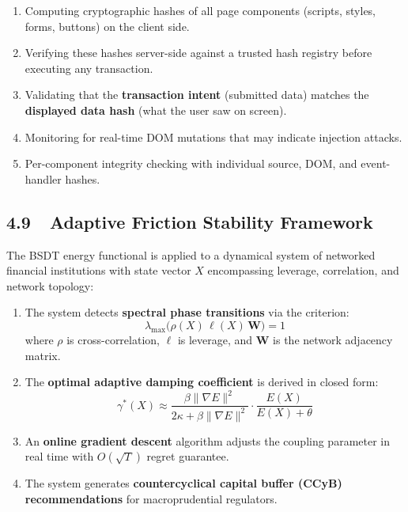 \documentclass[12pt,a4paper]{article}
\begin{document}
\begin{enumerate}
\item Computing cryptographic hashes of all page components (scripts, styles,
  forms, buttons) on the client side.

\item Verifying these hashes server-side against a trusted hash registry
  before executing any transaction.

\item Validating that the \textbf{transaction intent} (submitted data)
  matches the \textbf{displayed data hash} (what the user saw on screen).

\item Monitoring for real-time DOM mutations that may indicate injection
  attacks.

\item Per-component integrity checking with individual source, DOM, and
  event-handler hashes.
\end{enumerate}

\subsection{4.9~~Adaptive Friction Stability Framework}

The BSDT energy functional is applied to a dynamical system of networked
financial institutions with state vector $X$ encompassing leverage, correlation,
and network topology:

\begin{enumerate}
\item The system detects \textbf{spectral phase transitions} via the criterion:
  \[
    \lambda_{\max}\!\bigl(\rho(X) \, \ell(X) \, \mathbf{W}\bigr) = 1
  \]
  where $\rho$ is cross-correlation, $\ell$ is leverage, and $\mathbf{W}$ is
  the network adjacency matrix.

\item The \textbf{optimal adaptive damping coefficient} is derived in closed
  form:
  \[
    \gamma^*(X) \approx
    \frac{\beta \|\nabla E\|^2}{2\kappa + \beta \|\nabla E\|^2} \cdot
    \frac{E(X)}{E(X) + \theta}
  \]

\item An \textbf{online gradient descent} algorithm adjusts the coupling
  parameter in real time with $O(\sqrt{T})$ regret guarantee.

\item The system generates \textbf{countercyclical capital buffer (CCyB)
  recommendations} for macroprudential regulators.
\end{enumerate}
\end{document}
